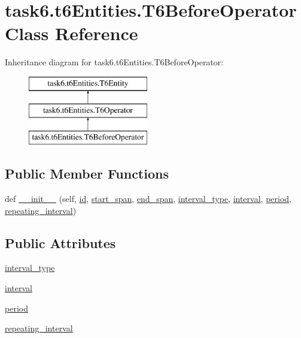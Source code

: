 \hypertarget{classtask6_1_1t6Entities_1_1T6BeforeOperator}{}\section{task6.\+t6\+Entities.\+T6\+Before\+Operator Class Reference}
\label{classtask6_1_1t6Entities_1_1T6BeforeOperator}
Inheritance diagram for task6.\+t6\+Entities.\+T6\+Before\+Operator\+:\begin{figure}[H]
\begin{center}
\leavevmode
\includegraphics[height=3.000000cm]{classtask6_1_1t6Entities_1_1T6BeforeOperator}
\end{center}
\end{figure}
\subsection*{Public Member Functions}
\begin{DoxyCompactItemize}
\item 
def \hyperlink{classtask6_1_1t6Entities_1_1T6BeforeOperator_a2a546c7ff84c52a10018e1cab9a59ef2}{\+\_\+\+\_\+init\+\_\+\+\_\+} (self, \hyperlink{classtask6_1_1t6Entities_1_1T6Entity_afeeced8134bb3ebe0cfecc64d0ab46a4}{id}, \hyperlink{classtask6_1_1t6Entities_1_1T6Entity_a52779e9af8864dc98e8b02fc5b9b041a}{start\+\_\+span}, \hyperlink{classtask6_1_1t6Entities_1_1T6Entity_aeb402200b156cd9562c5111dfe777b98}{end\+\_\+span}, \hyperlink{classtask6_1_1t6Entities_1_1T6BeforeOperator_a21cf9f8f978c26b5a2f70808a38d3cbf}{interval\+\_\+type}, \hyperlink{classtask6_1_1t6Entities_1_1T6BeforeOperator_ae1949d02c8d0ec34aa880a7c2165b69b}{interval}, \hyperlink{classtask6_1_1t6Entities_1_1T6BeforeOperator_a5d08ebe378bdb8b689cf2bf65a093f7e}{period}, \hyperlink{classtask6_1_1t6Entities_1_1T6BeforeOperator_a07e3c77e0df7c9afe548326b004b569b}{repeating\+\_\+interval})
\end{DoxyCompactItemize}
\subsection*{Public Attributes}
\begin{DoxyCompactItemize}
\item 
\hyperlink{classtask6_1_1t6Entities_1_1T6BeforeOperator_a21cf9f8f978c26b5a2f70808a38d3cbf}{interval\+\_\+type}
\item 
\hyperlink{classtask6_1_1t6Entities_1_1T6BeforeOperator_ae1949d02c8d0ec34aa880a7c2165b69b}{interval}
\item 
\hyperlink{classtask6_1_1t6Entities_1_1T6BeforeOperator_a5d08ebe378bdb8b689cf2bf65a093f7e}{period}
\item 
\hyperlink{classtask6_1_1t6Entities_1_1T6BeforeOperator_a07e3c77e0df7c9afe548326b004b569b}{repeating\+\_\+interval}
\end{DoxyCompactItemize}


